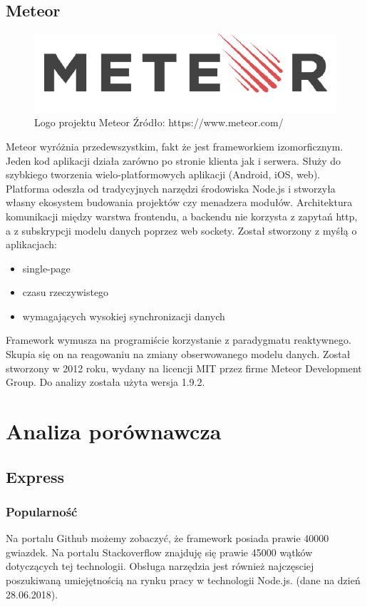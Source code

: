 \documentclass[12pt]{report}
\begin{document}
  \section{Meteor}
    \begin{figure}[!hb]
      \centering
      \includegraphics[width=\textwidth,height=\textheight,keepaspectratio]{logo_meteor.png} 
      \caption{Logo projektu Meteor \newline Źródło: https://www.meteor.com/}
    \end{figure}
    Meteor wyróżnia przedewszystkim, fakt że jest frameworkiem izomorficznym. 
    Jeden kod aplikacji działa zarówno po stronie klienta jak i serwera.
    Służy do szybkiego tworzenia wielo-platformowych aplikacji (Android, iOS, web).
    Platforma odeszła od tradycyjnych narzędzi środowiska Node.js i stworzyła własny ekosystem budowania projektów czy menadzera modułów.
    Architektura komunikacji między warstwa frontendu, a backendu nie korzysta z zapytań http, a z subskrypcji modelu danych poprzez web sockety.
    Został stworzony z myśłą o aplikacjach:
    \begin{itemize}
      \item single-page 
      \item czasu rzeczywistego
      \item wymagających wysokiej synchronizacji danych
    \end{itemize} 
    Framework wymusza na programiście korzystanie z paradygmatu reaktywnego.
    Skupia się on na reagowaniu na zmiany obserwowanego modelu danych.
    Został stworzony w 2012 roku, wydany na licencji MIT przez firme Meteor Development Group.
    Do analizy została użyta wersja 1.9.2.

\chapter{Analiza porównawcza}

  \section{Express}
    \subsection{Popularność}
      Na portalu Github możemy zobaczyć, że framework posiada prawie 40000 gwiazdek.
      Na portalu Stackoverflow znajduję się prawie 45000 wątków dotyczących tej technologii.
      Obsługa narzędzia jest również najczęsciej poszukiwaną umiejętnością na rynku pracy w technologii Node.js.
      (dane na dzień 28.06.2018).
\end{document}
